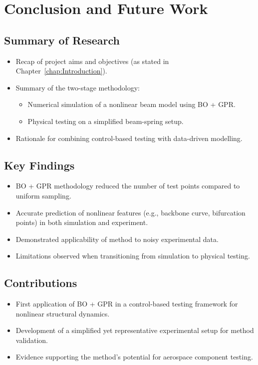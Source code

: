 \chapter{Conclusion and Future Work}

\section{Summary of Research}
\begin{itemize}
    \item Recap of project aims and objectives (as stated in Chapter~\ref{chap:Introduction}).
    \item Summary of the two-stage methodology:
    \begin{itemize}
        \item Numerical simulation of a nonlinear beam model using BO + GPR.
        \item Physical testing on a simplified beam-spring setup.
    \end{itemize}
    \item Rationale for combining control-based testing with data-driven modelling.
\end{itemize}

\section{Key Findings}
\begin{itemize}
    \item BO + GPR methodology reduced the number of test points compared to uniform sampling.
    \item Accurate prediction of nonlinear features (e.g., backbone curve, bifurcation points) in both simulation and experiment.
    \item Demonstrated applicability of method to noisy experimental data.
    \item Limitations observed when transitioning from simulation to physical testing.
\end{itemize}

\section{Contributions}
\begin{itemize}
    \item First application of BO + GPR in a control-based testing framework for nonlinear structural dynamics.
    \item Development of a simplified yet representative experimental setup for method validation.
    \item Evidence supporting the method’s potential for aerospace component testing.
\end{itemize}

